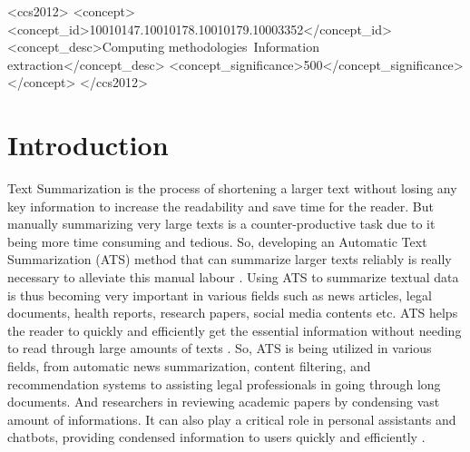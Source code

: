 \documentclass[acmlarge]{acmart}
\begin{document}
\begin{CCSXML}
	<ccs2012>
	<concept>
	<concept_id>10010147.10010178.10010179.10003352</concept_id>
	<concept_desc>Computing methodologies~Information extraction</concept_desc>
	<concept_significance>500</concept_significance>
	</concept>
	</ccs2012>
\end{CCSXML}




\maketitle

\section{Introduction}\label{sec:introduction}
Text Summarization is the process of shortening a larger text without losing any key information to increase the readability and save time for the reader. But manually summarizing very large texts is a counter-productive task due to it being more time consuming and tedious. So, developing an Automatic Text Summarization (ATS) method that can summarize larger texts reliably is really necessary to alleviate this manual labour \cite{Widyassari-2022-rev-ats-tech-met}. 
Using ATS to summarize textual data is thus becoming very important in various fields such as news articles, legal documents, health reports, research papers, social media contents etc. ATS helps the reader to quickly and efficiently get the essential information without needing to read through large amounts of texts \cite{wafaa-2021-summary-comprehensive-review}. So, ATS is being utilized in various fields, from automatic news summarization, content filtering, and recommendation systems to assisting legal professionals in going through long documents. And researchers in reviewing academic papers by condensing vast amount of informations. It can also play a critical role in personal assistants and chatbots, providing condensed information to users quickly and efficiently \cite{tas-2017-rev-text-sum-2}.
\end{document}
